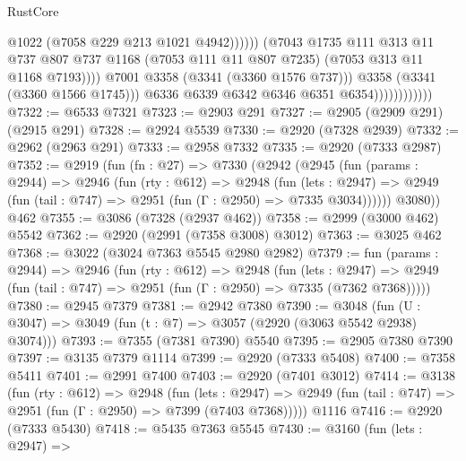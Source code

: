 \begin{lexlean}{RustCore}
\begin{coremodule}
                                              @1022
                                              (@7058 @229 @213 @1021 @4942))))))
                                    (@7043
                                      @1735
                                      @111
                                      @313
                                      @11
                                      @737
                                      @807
                                      @737
                                      @1168
                                      (@7053 @111 @11 @807 @7235)
                                      (@7053 @313 @11 @1168 @7193))))
                                @7001
                                @3358
                                (@3341 (@3360 @1576 @737)))
                              @3358
                              (@3341 (@3360 @1566 @1745)))
                            @6336
                            @6339
                            @6342
                            @6346
                            @6351
                            @6354))))))))))))
@7322 := @6533 @7321
@7323 := @2903 @291
@7327 := @2905 (@2909 @291) (@2915 @291)
@7328 := @2924 @5539
@7330 := @2920 (@7328 @2939)
@7332 := @2962 (@2963 @291)
@7333 := @2958 @7332
@7335 := @2920 (@7333 @2987)
@7352 := @2919
    (fun (fn : @27) =>
    @7330
      (@2942
        (@2945
          (fun (params : @2944) =>
          @2946
            (fun (rty : @612) =>
            @2948
              (fun (lets : @2947) =>
              @2949 (fun (tail : @747) => @2951 (fun (Γ : @2950) => @7335 @3034))))))
        @3080))
    @462
@7355 := @3086 (@7328 (@2937 @462))
@7358 := @2999 (@3000 @462) @5542
@7362 := @2920 (@2991 (@7358 @3008) @3012)
@7363 := @3025 @462
@7368 := @3022 (@3024 @7363 @5545 @2980 @2982)
@7379 := fun (params : @2944) =>
  @2946
    (fun (rty : @612) =>
    @2948
      (fun (lets : @2947) =>
      @2949 (fun (tail : @747) => @2951 (fun (Γ : @2950) => @7335 (@7362 @7368)))))
@7380 := @2945 @7379
@7381 := @2942 @7380
@7390 := @3048 (fun (U : @3047) => @3049 (fun (t : @7) => @3057 (@2920 (@3063 @5542 @2938) @3074)))
@7393 := @7355 (@7381 @7390) @5540
@7395 := @2905 @7380 @7390
@7397 := @3135 @7379 @1114
@7399 := @2920 (@7333 @5408)
@7400 := @7358 @5411
@7401 := @2991 @7400
@7403 := @2920 (@7401 @3012)
@7414 := @3138
    (fun (rty : @612) =>
    @2948
      (fun (lets : @2947) =>
      @2949 (fun (tail : @747) => @2951 (fun (Γ : @2950) => @7399 (@7403 @7368)))))
    @1116
@7416 := @2920 (@7333 @5430)
@7418 := @5435 @7363 @5545
@7430 := @3160
    (fun (lets : @2947) =>

\end{coremodule}
\end{lexlean}
